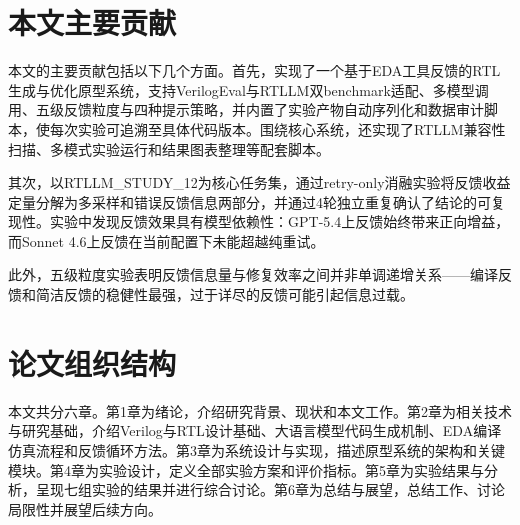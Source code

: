 \section{本文主要贡献}

本文的主要贡献包括以下几个方面。首先，实现了一个基于EDA工具反馈的RTL生成与优化原型系统，支持VerilogEval与RTLLM双benchmark适配、多模型调用、五级反馈粒度与四种提示策略，并内置了实验产物自动序列化和数据审计脚本，使每次实验可追溯至具体代码版本。围绕核心系统，还实现了RTLLM兼容性扫描、多模式实验运行和结果图表整理等配套脚本。

其次，以RTLLM\_STUDY\_12为核心任务集，通过retry-only消融实验将反馈收益定量分解为多采样和错误反馈信息两部分，并通过4轮独立重复确认了结论的可复现性。实验中发现反馈效果具有模型依赖性：GPT-5.4上反馈始终带来正向增益，而Sonnet 4.6上反馈在当前配置下未能超越纯重试。

此外，五级粒度实验表明反馈信息量与修复效率之间并非单调递增关系——编译反馈和简洁反馈的稳健性最强，过于详尽的反馈可能引起信息过载。

\section{论文组织结构}

本文共分六章。第1章为绪论，介绍研究背景、现状和本文工作。第2章为相关技术与研究基础，介绍Verilog与RTL设计基础、大语言模型代码生成机制、EDA编译仿真流程和反馈循环方法。第3章为系统设计与实现，描述原型系统的架构和关键模块。第4章为实验设计，定义全部实验方案和评价指标。第5章为实验结果与分析，呈现七组实验的结果并进行综合讨论。第6章为总结与展望，总结工作、讨论局限性并展望后续方向。

